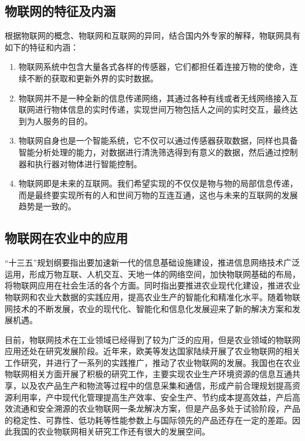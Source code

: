	\subsection{物联网的特征及内涵}
	根据物联网的概念、物联网和互联网的异同，结合国内外专家的解释，物联网具有如下的特征和内涵：
	\begin{enumerate}
  		\item 物联网系统中包含大量各式各样的传感器，它们都担任着连接万物的使命，连续不断的获取和更新外界的实时数据。
  		\item 物联网并不是一种全新的信息传递网络，其通过各种有线或者无线网络接入互联网进行物体信息的实时传递，实现世间万物包括人之间的实时交互，最终达到为人服务的目的。
  		\item 物联网自身也是一个智能系统，它不仅可以通过传感器获取数据，同样也具备智能分析处理的能力，对数据进行清洗筛选得到有意义的数据，然后通过控制器和执行器对物体进行智能控制。
  		\item 物联网即是未来的互联网。我们希望实现的不仅仅是物与物的局部信息传递，而是最终要实现所有的人和世间万物的互连互通，这也与未来的互联网的发展趋势是一致的。
	\end{enumerate}
	
	\subsection{物联网在农业中的应用}
	“十三五”规划纲要指出要加速新一代的信息基础设施建设，推进信息网络技术广泛运用，形成万物互联、人机交互、天地一体的网络空间，加快物联网基础的布局，将物联网应用在社会生活的各个方面。同时指出要推进农业现代化建设，推进农业物联网和农业大数据的实践应用，提高农业生产的智能化和精准化水平。随着物联网技术的不断发展，农业的现代化、智能化和信息化发展迎来了新的解决方案和发展机遇。
	
目前，物联网技术在工业领域已经得到了较为广泛的应用，但是农业领域的物联网应用还处在研究发展阶段。近年来，欧美等发达国家陆续开展了农业物联网的相关工作研究，并进行了一系列的实践推广，推动了农业物联网的发展。我国也在农业物联网相关方面开展了积极的研究工作，主要实现农业生产环境资源的信息互通共享，以及农产品生产和物流等过程中的信息采集和通信，形成产前合理规划提高资源利用率，产中现代化管理提高生产效率、安全生产、节约成本提高效益，产后高效流通和安全溯源的农业物联网一条龙解决方案，但是产品多处于试验阶段，产品的稳定性、可靠性、低功耗等性能参数上与国际领先的产品还存在一定的差距。因此我国的农业物联网相关研究工作还有很大的发展空间。
	
